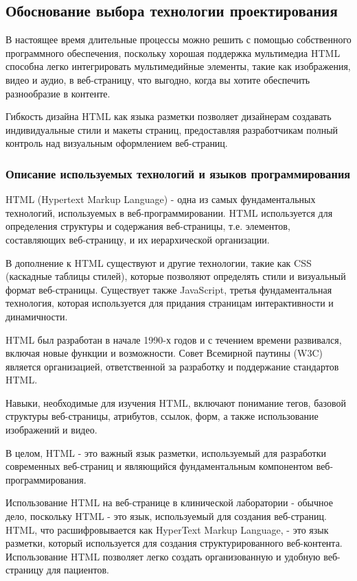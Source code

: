 \subsection{Обоснование выбора технологии проектирования}

В настоящее время длительные процессы можно решить с помощью собственного программного обеспечения, поскольку хорошая поддержка мультимедиа HTML способна легко интегрировать мультимедийные элементы, такие как изображения, видео и аудио, в веб-страницу, что выгодно, когда вы хотите обеспечить разнообразие в контенте.

Гибкость дизайна HTML как языка разметки позволяет дизайнерам создавать индивидуальные стили и макеты страниц, предоставляя разработчикам полный контроль над визуальным оформлением веб-страниц.


\subsubsection{Описание используемых технологий и языков программирования}

HTML (Hypertext Markup Language) - одна из самых фундаментальных технологий, используемых в веб-программировании. HTML используется для определения структуры и содержания веб-страницы, т.е. элементов, составляющих веб-страницу, и их иерархической организации.

В дополнение к HTML существуют и другие технологии, такие как CSS (каскадные таблицы стилей), которые позволяют определять стили и визуальный формат веб-страницы. Существует также JavaScript, третья фундаментальная технология, которая используется для придания страницам интерактивности и динамичности.

HTML был разработан в начале 1990-х годов и с течением времени развивался, включая новые функции и возможности. Совет Всемирной паутины (W3C) является организацией, ответственной за разработку и поддержание стандартов HTML.

Навыки, необходимые для изучения HTML, включают понимание тегов, базовой структуры веб-страницы, атрибутов, ссылок, форм, а также использование изображений и видео.

В целом, HTML - это важный язык разметки, используемый для разработки современных веб-страниц и являющийся фундаментальным компонентом веб-программирования.

Использование HTML на веб-странице в клинической лаборатории - обычное дело, поскольку HTML - это язык, используемый для создания веб-страниц. HTML, что расшифровывается как HyperText Markup Language, - это язык разметки, который используется для создания структурированного веб-контента. Использование HTML позволяет легко создать организованную и удобную веб-страницу для пациентов.

